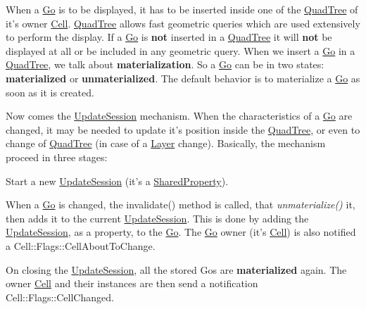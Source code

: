 When a \hyperlink{classHurricane_1_1Go}{Go} is to be displayed, it has to be inserted inside one of the \hyperlink{classHurricane_1_1QuadTree}{Quad\-Tree} of it's owner \hyperlink{classHurricane_1_1Cell}{Cell}. \hyperlink{classHurricane_1_1QuadTree}{Quad\-Tree} allows fast geometric queries which are used extensively to perform the display. If a \hyperlink{classHurricane_1_1Go}{Go} is {\bfseries not} inserted in a \hyperlink{classHurricane_1_1QuadTree}{Quad\-Tree} it will {\bfseries not} be displayed at all or be included in any geometric query. When we insert a \hyperlink{classHurricane_1_1Go}{Go} in a \hyperlink{classHurricane_1_1QuadTree}{Quad\-Tree}, we talk about {\bfseries materialization}. So a \hyperlink{classHurricane_1_1Go}{Go} can be in two states\-: {\bfseries materialized} or {\bfseries unmaterialized}. The default behavior is to materialize a \hyperlink{classHurricane_1_1Go}{Go} as soon as it is created.

Now comes the \hyperlink{classHurricane_1_1UpdateSession}{Update\-Session} mechanism. When the characteristics of a \hyperlink{classHurricane_1_1Go}{Go} are changed, it may be needed to update it's position inside the \hyperlink{classHurricane_1_1QuadTree}{Quad\-Tree}, or even to change of \hyperlink{classHurricane_1_1QuadTree}{Quad\-Tree} (in case of a \hyperlink{classHurricane_1_1Layer}{Layer} change). Basically, the mechanism proceed in three stages\-:


\begin{DoxyItemize}
\item Start a new \hyperlink{classHurricane_1_1UpdateSession}{Update\-Session} (it's a \hyperlink{classHurricane_1_1SharedProperty}{Shared\-Property}).
\item When a \hyperlink{classHurricane_1_1Go}{Go} is changed, the {\ttfamily invalidate()} method is called, that {\itshape unmaterialize()} it, then adds it to the current \hyperlink{classHurricane_1_1UpdateSession}{Update\-Session}. This is done by adding the \hyperlink{classHurricane_1_1UpdateSession}{Update\-Session}, as a property, to the \hyperlink{classHurricane_1_1Go}{Go}. The \hyperlink{classHurricane_1_1Go}{Go} owner (it's \hyperlink{classHurricane_1_1Cell}{Cell}) is also notified a {\ttfamily Cell\-::\-Flags\-::\-Cell\-About\-To\-Change}.
\item On closing the \hyperlink{classHurricane_1_1UpdateSession}{Update\-Session}, all the stored Gos are {\bfseries materialized} again. The owner \hyperlink{classHurricane_1_1Cell}{Cell} and their instances are then send a notification {\ttfamily Cell\-::\-Flags\-::\-Cell\-Changed}.
\end{DoxyItemize}

